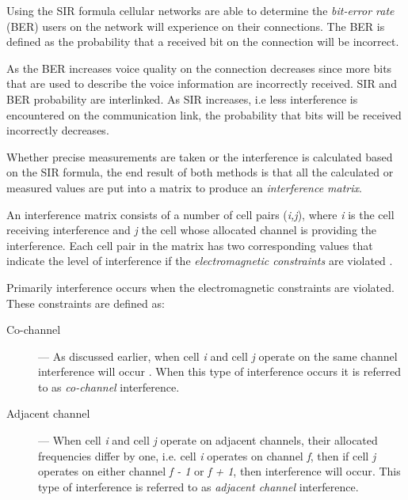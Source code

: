 Using the SIR formula cellular networks are able to determine the \emph{bit-error rate} (BER) users on the network will experience on their connections\cite{WirelessDigitalCommunications}. The BER is defined as the probability that a received bit on the connection will be incorrect\cite{MobileWirelessCommunications}. 

As the BER increases voice quality on the connection decreases since more bits that are used to describe the voice information are incorrectly received\cite{WirelessDigitalCommunications}. SIR and BER probability are interlinked. As SIR increases, i.e less interference is encountered on the communication link, the probability that bits will be received incorrectly decreases\cite{WirelessDigitalCommunications}.

Whether precise measurements are taken or the interference is calculated based on the SIR formula, the end result of both methods is that all the calculated or measured values are put into a matrix to produce an \emph{interference matrix}\cite{ACOvsEA}.

An interference matrix consists of a number of cell pairs (\emph{i,j}), where \emph{i} is the cell receiving interference and \emph{j} the cell whose allocated channel is providing the interference\cite{Karen2004}. Each cell pair in the matrix has two corresponding values that indicate the level of interference if the \emph{electromagnetic constraints} are violated \cite{ACOvsEA,AndreasPaper}. 

Primarily interference occurs when the electromagnetic constraints are violated. These constraints are defined as:
\begin{description}
\item[Co-channel] --- As discussed earlier, when cell \emph{i} and cell \emph{j} operate on the same channel interference will occur \cite{GSMSysEngin,PrinciplesMobileCommunication}. When this type of interference occurs it is referred to as \emph{co-channel} interference.
\item[Adjacent channel] --- When cell \emph{i} and cell \emph{j} operate on adjacent channels, their allocated frequencies differ by one, i.e. cell \emph{i} operates on channel \emph{f}, then if cell \emph{j} operates on either channel \emph{f - 1} or \emph{f + 1}, then interference will occur\cite{GSMSysEngin,InterferenceOrientatedFAP}. This type of interference is referred to as \emph{adjacent channel} interference.
\end{description}

